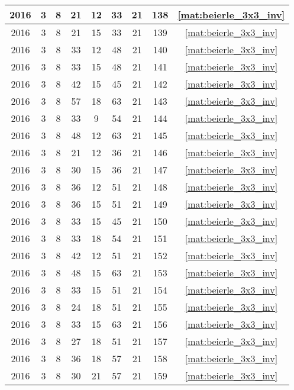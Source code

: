 \begin{longtable}{|c|c|c|c|c|c|c|c|c|}
2016 & 3 & 8 & 21 & 12 & 33 & 21 & 138 & \eqref{mat:beierle_3x3_inv} \\ \hline 
2016 & 3 & 8 & 21 & 15 & 33 & 21 & 139 & \eqref{mat:beierle_3x3_inv} \\ \hline 
2016 & 3 & 8 & 33 & 12 & 48 & 21 & 140 & \eqref{mat:beierle_3x3_inv} \\ \hline 
2016 & 3 & 8 & 33 & 15 & 48 & 21 & 141 & \eqref{mat:beierle_3x3_inv} \\ \hline 
2016 & 3 & 8 & 42 & 15 & 45 & 21 & 142 & \eqref{mat:beierle_3x3_inv} \\ \hline 
2016 & 3 & 8 & 57 & 18 & 63 & 21 & 143 & \eqref{mat:beierle_3x3_inv} \\ \hline 
2016 & 3 & 8 & 33 & 9 & 54 & 21 & 144 & \eqref{mat:beierle_3x3_inv} \\ \hline 
2016 & 3 & 8 & 48 & 12 & 63 & 21 & 145 & \eqref{mat:beierle_3x3_inv} \\ \hline 
2016 & 3 & 8 & 21 & 12 & 36 & 21 & 146 & \eqref{mat:beierle_3x3_inv} \\ \hline 
2016 & 3 & 8 & 30 & 15 & 36 & 21 & 147 & \eqref{mat:beierle_3x3_inv} \\ \hline 
2016 & 3 & 8 & 36 & 12 & 51 & 21 & 148 & \eqref{mat:beierle_3x3_inv} \\ \hline 
2016 & 3 & 8 & 36 & 15 & 51 & 21 & 149 & \eqref{mat:beierle_3x3_inv} \\ \hline 
2016 & 3 & 8 & 33 & 15 & 45 & 21 & 150 & \eqref{mat:beierle_3x3_inv} \\ \hline 
2016 & 3 & 8 & 33 & 18 & 54 & 21 & 151 & \eqref{mat:beierle_3x3_inv} \\ \hline 
2016 & 3 & 8 & 42 & 12 & 51 & 21 & 152 & \eqref{mat:beierle_3x3_inv} \\ \hline 
2016 & 3 & 8 & 48 & 15 & 63 & 21 & 153 & \eqref{mat:beierle_3x3_inv} \\ \hline 
2016 & 3 & 8 & 33 & 15 & 51 & 21 & 154 & \eqref{mat:beierle_3x3_inv} \\ \hline 
2016 & 3 & 8 & 24 & 18 & 51 & 21 & 155 & \eqref{mat:beierle_3x3_inv} \\ \hline 
2016 & 3 & 8 & 33 & 15 & 63 & 21 & 156 & \eqref{mat:beierle_3x3_inv} \\ \hline 
2016 & 3 & 8 & 27 & 18 & 51 & 21 & 157 & \eqref{mat:beierle_3x3_inv} \\ \hline 
2016 & 3 & 8 & 36 & 18 & 57 & 21 & 158 & \eqref{mat:beierle_3x3_inv} \\ \hline 
2016 & 3 & 8 & 30 & 21 & 57 & 21 & 159 & \eqref{mat:beierle_3x3_inv} \\ \hline 

\end{longtable}
